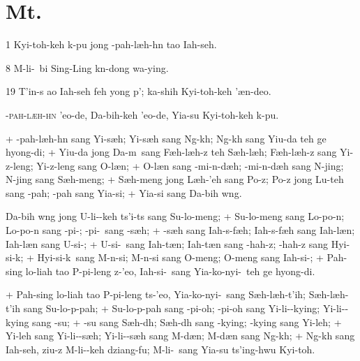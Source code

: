 \setcounter{page}{1}


\section{Mt.}%

\begin{sAbstract}
	\item[1] Kyi-toh-keh k\oo-pu jong \OO-pah-l\ae h-h\e n tao Iah-seh.
	\item[8] M\oo-li-\oo\ bi Sing-Ling k\e n-dong wa-ying.
	\item[19] T'in-s ao Iah-seh feh y\y ong p'\oo; ka-shih Kyi-toh-keh '\ae n-deo.
\end{sAbstract}

\header
\lettrine{\OO}{-pah-l\ae h-h\e n} 'eo-de, Da-bih-keh 'eo-de, Yia-su Kyi-toh-keh k\oo-pu.
\par
\hspace{1ex}
+	\OO-pah-l\ae h-h\e n sang Yi-s\ae h; Yi-s\ae h sang Ng\oo-k\oo h; Ng\oo-k\oo h sang Yiu-da teh ge hy\y ong-di;
+	Yiu-da jong Da-m\oo\ sang F\ae h-l\ae h-z teh S\ae h-l\ae h; F\ae h-l\ae h-z sang Yi-z-leng; Yi-z-leng sang O-l\ae n;
+	O-l\ae n sang \OO-mi-n\oo-d\ae h; \OO-mi-n\oo-d\ae h sang N\oo-jing; N\oo-jing sang S\ae h-meng;
+	S\ae h-meng jong L\ae h-'eh sang Po-z; Po-z jong Lu-teh sang \OO-pah; \OO-pah sang Yia-si;
+	Yia-si sang Da-bih w\oo ng. \par Da-bih w\oo ng jong U-li-\oo-keh ts'i-ts sang Su-lo-meng;
+	Su-lo-meng sang Lo-po-\e n; Lo-po-\e n sang \OO-pi-\oo; \OO-pi-\oo\ sang \OO-s\ae h;
+	\OO-s\ae h sang Iah-s\oo-f\ae h; Iah-s\oo-f\ae h sang Iah-l\ae n; Iah-l\ae n sang U-si-\oo;
+	U-si-\oo\ sang Iah-t\ae n; Iah-t\ae n sang \OO-hah-z; \OO-hah-z sang Hyi-si-k\oo;
+	Hyi-si-k\oo\ sang M\oo-n\oo-si; M\oo-n\oo-si sang O-meng; O-meng sang Iah-si-\oo;
+	Pah-sing lo-liah tao P\oo-pi-leng z-'eo, Iah-si-\oo\ sang Yia-ko-nyi-\oo\ teh ge hy\y ong-di.
\par
+	Pah-sing lo-liah tao P\oo-pi-leng ts-'eo, Yia-ko-nyi-\oo\ sang S\ae h-l\ae h-t'ih; S\ae h-l\ae h-t'ih sang Su-lo-p\oo-pah;
+	Su-lo-p\oo-pah sang \OO-pi-\y oh; \OO-pi-\y oh sang Yi-li-\oo-kying; Yi-li-\oo-kying sang \OO-su;
+	\OO-su sang S\ae h-d\oo h; S\ae h-d\oo h sang \OO-kying; \OO-kying sang Yi-leh;
+	Yi-leh sang Yi-li-\oo-s\ae h; Yi-li-\oo-s\ae h sang M\oo-d\ae n; M\oo-d\ae n sang Ng\oo-k\oo h;
+	Ng\oo-k\oo h sang Iah-seh, ziu-z M\oo-li-\oo-keh dziang-fu; M\oo-li-\oo\ sang Yia-su ts'ing-hwu Kyi-toh.
